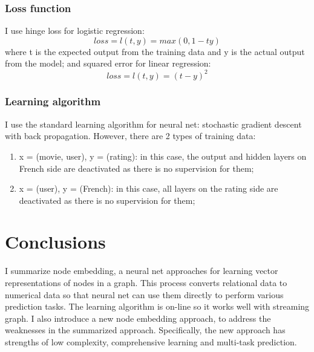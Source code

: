 \documentclass{article}
\begin{document}
\subsubsection{Loss function}
I use hinge loss for logistic regression:
\begin{equation}
loss = l(t, y) = max(0, 1 - ty)
\end{equation}
where t is the expected output from the training data and y is the actual output from the model; and squared error for linear regression:
\begin{equation}
	loss = l(t, y) = (t - y)^2
\end{equation}

\subsubsection{Learning algorithm}
I use the standard learning algorithm for neural net: stochastic gradient descent with back propagation. However, there are 2 types of training data:
\begin{enumerate}
	\item x = (movie, user), y = (rating): in this case, the output and hidden layers on French side are deactivated as there is no supervision for them;
	\item x = (user), y = (French): in this case, all layers on the rating side are deactivated as there is no supervision for them;
\end{enumerate}

\section{Conclusions}
I summarize node embedding, a neural net approaches for learning vector representations of nodes in a graph. This process converts relational data to numerical data so that neural net can use them directly to perform various prediction tasks. The learning algorithm is on-line so it works well with streaming graph. I also introduce a new node embedding approach, to address the weaknesses in the summarized approach. Specifically, the new approach has strengths of low complexity, comprehensive learning and multi-task prediction.



\end{document}
